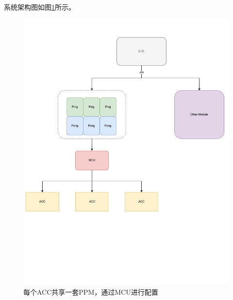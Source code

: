 \documentclass[a4paper, 12pt]{article}
\begin{document}
系统架构图如图\ref{fig:acc_mcu}所示。
\begin{figure}
  \centering
  \includegraphics[width=\linewidth]{./images/acc_mcu.pdf}
  \caption{每个ACC共享一套PPM，通过MCU进行配置}
  \label{fig:acc_mcu}
\end{figure}

\newpage
\end{document}
